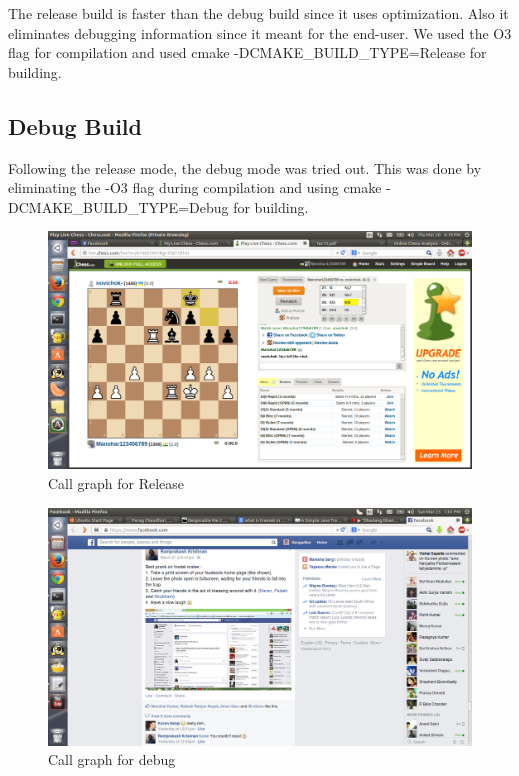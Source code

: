\documentclass[11pt]{article}
\begin{document}
The release build is faster than the debug build since it uses optimization. Also it eliminates debugging information since it meant for the end-user. We used the O3 flag for compilation and used cmake -DCMAKE\_BUILD\_TYPE=Release for building.


\subsection{Debug Build}

Following the release mode, the debug mode was tried out. This was done by eliminating the -O3 flag during compilation and using cmake -DCMAKE\_BUILD\_TYPE=Debug  for building.

\begin{figure}[ht!]
\centering
\includegraphics[width=150mm]{g32_debug_prof.png}
\caption{Call graph for Release}
\label{overflow}
\end{figure}

\begin{figure}[ht!]
\centering
\includegraphics[width=150mm]{debug.png}
\caption{Call graph for debug}
\label{overflow}
\end{figure}
\end{document}
